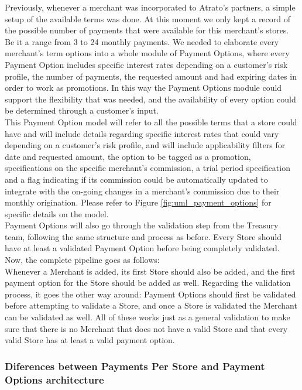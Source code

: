 Previously, whenever a merchant was incorporated to Atrato’s partners, a simple setup of the available terms was done. At this moment we only kept a record of the possible number of payments that were available for this merchant’s stores. Be it a range from 3 to 24 monthly payments. We needed to elaborate every merchant’s term options into a whole module of Payment Options, where every Payment Option includes specific interest rates depending on a customer’s risk profile, the number of payments, the requested amount and had expiring dates in order to work as promotions. In this way the Payment Options module could support the flexibility that was needed, and the availability of every option could be determined through a customer’s input.\\

This Payment Option model will refer to all the possible terms that a store could have and will include details regarding specific interest rates that could vary depending on a customer’s risk profile, and will include applicability filters for date and requested amount, the option to be tagged as a promotion, specifications on the specific merchant’s commission, a trial period specification and a flag indicating if its commission could be automatically updated to integrate with the on-going changes in a merchant’s commission due to their monthly origination. Please refer to Figure \ref{fig:uml_payment_options} for specific details on the model.\\

Payment Options will also go through the validation step from the Treasury team, following the same structure and process as before. Every Store should have at least a validated Payment Option before being completely validated. Now, the complete pipeline goes as follows:\\

Whenever a Merchant is added, its first Store should also be added, and the first payment option for the Store should be added as well. Regarding the validation process, it goes the other way around: Payment Options should first be validated before attempting to validate a Store, and once a Store is validated the Merchant can be validated as well. All of these works just as a general validation to make sure that there is no Merchant that does not have a valid Store and that every valid Store has at least a valid payment option.

\subsubsection{Diferences between Payments Per Store and Payment Options architecture}

